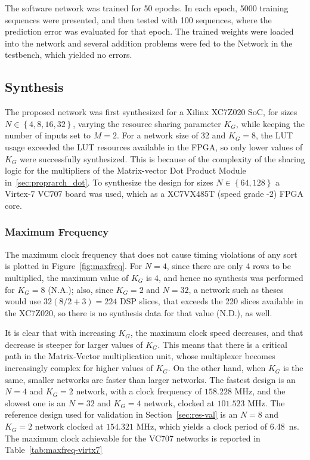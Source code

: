 \documentclass{IEEEtran}
\begin{document}
The software network was trained for 50 epochs. In each epoch, 5000 training sequences were presented, and then tested with 100 sequences, where the
prediction error was evaluated for that epoch. The trained weights were loaded into the network and several addition problems
were fed to the Network in the testbench, which yielded no errors.

\subsection{Synthesis}\label{sec:results_synth}
The proposed network was first synthesized for a Xilinx XC7Z020 SoC, for sizes $N \in \left\{4, 8, 16, 32\right\}$, varying the resource sharing parameter $K_G$, while keeping the number of inputs set
to $M=2$. For a network size of 32 and $K_G=8$, the LUT usage exceeded the LUT resources available in the FPGA, so only lower values of $K_G$ were
successfully synthesized. This is because of the complexity of the sharing logic for the multipliers of the Matrix-vector Dot Product Module in~\ref{sec:proprarch_dot}. To synthesize the
design for sizes $N \in \left\{64, 128 \right\}$ a Virtex-7 VC707 board was used, which as a XC7VX485T (speed grade -2) FPGA core.

\subsubsection{Maximum Frequency}\label{sec:results_synth_maxfreq}
The maximum clock frequency that does not cause timing violations of any sort is plotted in Figure~\ref{fig:maxfreq}. For $N=4$, since there are
only 4 rows to be multiplied, the maximum value of $K_G$ is 4, and hence no synthesis was performed for $K_G = 8$ (N.A.); also,
since $K_G = 2$ and $N=32$, a network such as theses would use $32(8/2+3) = 224$ DSP slices, that exceeds the 220 slices
available in the XC7Z020, so there is no synthesis data for that value (N.D.), as well.

It is clear that with increasing $K_G$, the maximum clock speed decreases, and that decrease is steeper for larger values
of $K_G$. This means that there is a critical path in the Matrix-Vector multiplication unit, whose multiplexer becomes
increasingly complex for higher values of $K_G$. On the other hand, when $K_G$ is the same, smaller networks are faster
than larger networks. The fastest design is an $N=4$ and $K_G = 2$ network, with a clock frequency of $158.228$ MHz, and
the slowest one is an $N=32$ and $K_G=4$ network, clocked at $101.523$ MHz. The reference design used for validation in
Section~\ref{sec:res-val} is an $N=8$ and $K_G=2$ network clocked at $154.321$ MHz, which yields a clock period of
\SI{6.48}{\nano\second}. The maximum clock achievable for the VC707 networks is reported in Table~\ref{tab:maxfreq-virtx7}
\end{document}
